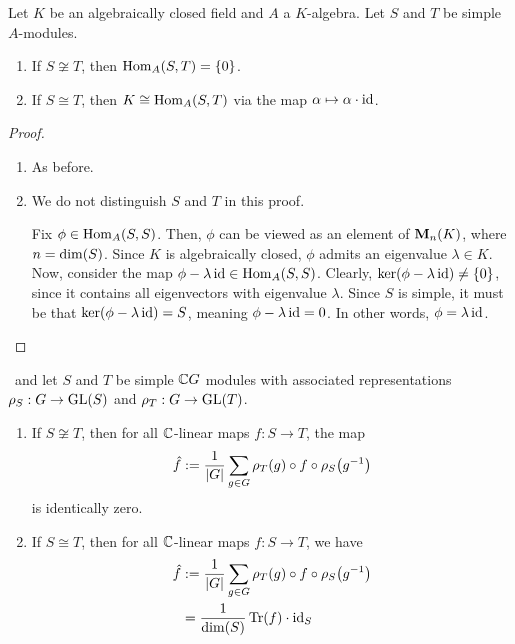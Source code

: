 \begin{theorem}
    Let $K$ be an algebraically closed field and $A$ a $K$-algebra. Let $S$ and $T$ be simple $A$-modules.
    \begin{enumerate}[label = \normalfont \arabic*., noitemsep]
        \item If $S \not\cong T$, then $\operatorname{Hom}_A(S, T) = \left\{ 0 \right\}$.
        \item If $S \cong T$, then $K \cong \operatorname{Hom}_A(S, T)$ via the map $\alpha \mapsto \alpha \cdot \operatorname{id}$.
    \end{enumerate}
\end{theorem}
\begin{proof}
    \hfill
    \begin{enumerate}
        \item As before.
        \item We do not distinguish $S$ and $T$ in this proof.
        
        Fix $\phi \in \operatorname{Hom}_A(S,S)$. Then, $\phi$ can be viewed as an element of $\mathbf{M}_{n}\!\left( K \right)$, where $n = \dim\!\left( S \right)$. Since $K$ is algebraically closed, $\phi$ admits an eigenvalue $\lambda \in K$. Now, consider the map $\phi - \lambda \operatorname{id} \in \operatorname{Hom}_A(S,S)$. Clearly, $\operatorname{ker}\!\left( \phi - \lambda \operatorname{id} \right) \neq \left\{ 0 \right\}$, since it contains all eigenvectors with eigenvalue $\lambda$. Since $S$ is simple, it must be that $\operatorname{ker}\!\left( \phi - \lambda \operatorname{id} \right) = S$, meaning $\phi - \lambda \operatorname{id} = 0$. In other words, $\phi = \lambda \operatorname{id}$.  %
    \end{enumerate}
\end{proof}

\begin{boxtheorem}
    \ and let $S$ and $T$ be simple $\mathbb{C} G$ modules with associated representations $\rho_S : G \to \operatorname{GL}\!\left( S \right)$ and $\rho_T : G \to \operatorname{GL}\!\left( T \right)$.
    \begin{enumerate}[label = \normalfont \arabic*.]
        \item If $S \not\cong T$, then for all $\mathbb{C}$-linear maps $f : S \to T$, the map
        \begin{align*}
            \hat{f} := \frac{1}{\left\lvert G \right\rvert} \sum_{g \in G} \rho_T(g) \circ f \circ \rho_S\!\left( g^{-1} \right)
        \end{align*}
        is identically zero.

        \item If $S \cong T$, then for all $\mathbb{C}$-linear maps $f : S \to T$, we have
        \begin{align*}
            \hat{f} &:= \frac{1}{\left\lvert G \right\rvert} \sum_{g \in G} \rho_T(g) \circ f \circ \rho_S\!\left( g^{-1} \right) \\
            &= \frac{1}{\dim\!\left( S \right)} \operatorname{Tr}\!\left( f \right) \cdot \operatorname{id}_S
        \end{align*}
    \end{enumerate}
\end{boxtheorem}

